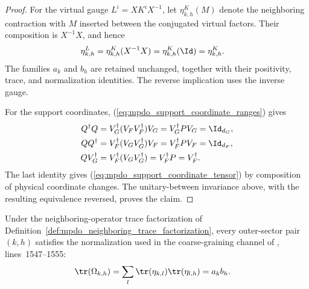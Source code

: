 \begin{proof}
    \leanok
    For the virtual gauge $L^i=XK^iX^{-1}$, let
    $\eta^K_{k,h}(M)$ denote the neighboring contraction with $M$ inserted
    between the conjugated virtual factors.  Their composition is
    $X^{-1}X$, and hence
    \begin{align}
        \eta^L_{k,h}
         & =\eta^K_{k,h}(X^{-1}X)
        =\eta^K_{k,h}(\Id)
        =\eta^K_{k,h}.
        \notag
    \end{align}
    The families $a_k$ and $b_h$ are retained unchanged, together with their
    positivity, trace, and normalization identities.  The reverse implication
    uses the inverse gauge.

    For the support coordinates,
    (\ref{eq:mpdo_support_coordinate_ranges}) gives
    \begin{align}
        Q^\dagger Q
         & =V_G^\dagger(V_FV_F^\dagger)V_G
        =V_G^\dagger PV_G
        =\Id_{d_G},
        \notag                             \\
        QQ^\dagger
         & =V_F^\dagger(V_GV_G^\dagger)V_F
        =V_F^\dagger PV_F
        =\Id_{d_F},
        \notag                             \\
        QV_G^\dagger
         & =V_F^\dagger(V_GV_G^\dagger)
        =V_F^\dagger P
        =V_F^\dagger.
        \notag
    \end{align}
    The last identity gives
    (\ref{eq:mpdo_support_coordinate_tensor}) by composition of physical
    coordinate changes.  The unitary-between invariance above, with the
    resulting equivalence reversed, proves the claim.
\end{proof}

\begin{lemma}
    \label{thm:mpdo_physical_sector_three_site_neighboring_operator_trace}
    \leanok
    Under the neighboring-operator trace factorization of
    Definition~\ref{def:mpdo_neighboring_trace_factorization}, every
    outer-sector pair $(k,h)$ satisfies the normalization used in the
    coarse-graining channel of
    \cite[Appendix~C.2]{Cirac2016MPDO_arXiv}, lines~1547--1555:
    \begin{align}
        \tr(\Omega_{k,h})
         & =\sum_l\tr(\eta_{k,l})\tr(\eta_{l,h})
        =a_kb_h.
        \notag
    \end{align}
\end{lemma}

